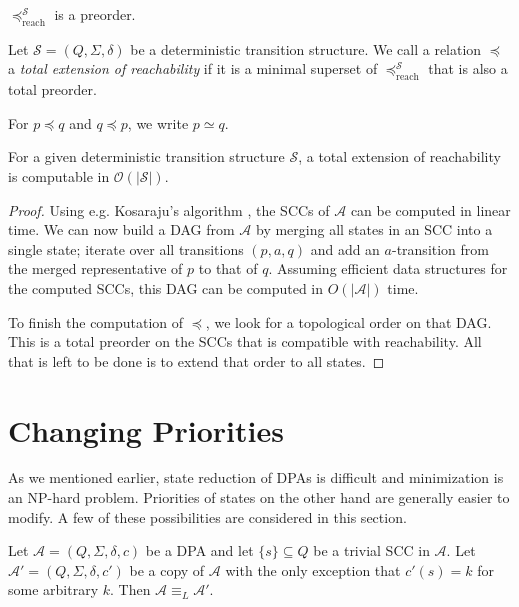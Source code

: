 \begin{lem}
	$\preceq_\text{reach}^\mathcal{S}$ is a preorder.
\end{lem}

\begin{defn}
	Let $\mathcal{S} = (Q, \Sigma, \delta)$ be a deterministic transition structure. We call a relation $\preceq$ a \emph{total extension of reachability} if it is a minimal superset of $\preceq_\text{reach}^\mathcal{S}$ that is also a total preorder.
	
	For $p \preceq q$ and $q \preceq p$, we write $p \simeq q$.
\end{defn}

\begin{lem}
	For a given deterministic transition structure $\mathcal{S}$, a total extension of reachability is computable in $\mathcal{O}(|\mathcal{S}|)$.
	\label{lem:general:reach_topo_lintime}
\end{lem}

\begin{proof}
	Using e.g. Kosaraju's algorithm \cite{Sharir81}, the SCCs of $\mathcal{A}$ can be computed in linear time. We can now build a DAG from $\mathcal{A}$ by merging all states in an SCC into a single state; iterate over all transitions $(p, a, q)$ and add an $a$-transition from the merged representative of $p$ to that of $q$. Assuming efficient data structures for the computed SCCs, this DAG can be computed in $O(|\mathcal{A}|)$ time.
	
	To finish the computation of $\preceq$, we look for a topological order on that DAG. This is a total preorder on the SCCs that is compatible with reachability. All that is left to be done is to extend that order to all states.
\end{proof}




\section{Changing Priorities}
As we mentioned earlier, state reduction of DPAs is difficult and minimization is an NP-hard problem. Priorities of states on the other hand are generally easier to modify. A few of these possibilities are considered in this section.

\begin{lem}
\label{lem:general:trivial_scc_dont_matter}
	Let $\mathcal{A} = (Q, \Sigma, \delta, c)$ be a DPA and let $\{s\} \subseteq Q$ be a trivial SCC in $\mathcal{A}$. Let $\mathcal{A}' = (Q, \Sigma, \delta, c')$ be a copy of $\mathcal{A}$ with the only exception that $c'(s) = k$ for some arbitrary $k$. Then $\mathcal{A} \equiv_L \mathcal{A}'$.
\end{lem}

